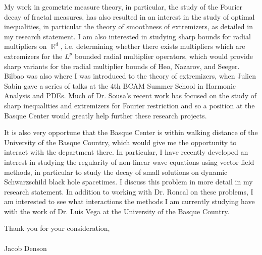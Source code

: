 \documentclass[12pt,stdletter,orderfromtodate,sigleft]{newlfm}
\DeclareMathOperator{\RR}{\mathbb{R}}
\begin{document}
\begin{newlfm}
\begin{spacing}{1.13}
My work in geometric measure theory, in particular, the study of the Fourier decay of fractal measures, has also resulted in an interest in the study of optimal inequalities, in particular the theory of smoothness of extremizers, as detailed in my research statement. I am also interested in studying sharp bounds for radial multipliers on $\RR^d$, i.e. determining whether there exists multipliers which are extremizers for the $L^p$ bounded radial multiplier operators, which would provide sharp variants for the radial multiplier bounds of Heo, Nazarov, and Seeger. Bilbao was also where I was introduced to the theory of extremizers, when Julien Sabin gave a series of talks at the 4th BCAM Summer School in Harmonic Analysis and PDEs. Much of Dr. Sousa's recent work has focused on the study of sharp inequalities and extremizers for Fourier restriction and so a position at the Basque Center would greatly help further these research projects.

It is also very opportune that the Basque Center is within walking distance of the University of the Basque Country, which would give me the opportunity to interact with the department there. In particular, I have recently developed an interest in studying the regularity of non-linear wave equations using vector field methods, in particular to study the decay of small solutions on dynamic Schwarzschild black hole spacetimes. I discuss this problem in more detail in my research statement. In addition to working with Dr. Roncal on these problems, I am interested to see what interactions the methods I am currently studying have with the work of Dr. Luis Vega at the University of the Basque Country.

Thank you for your consideration,\\\\
Jacob Denson

\end{spacing}

\end{newlfm}
\end{document}

